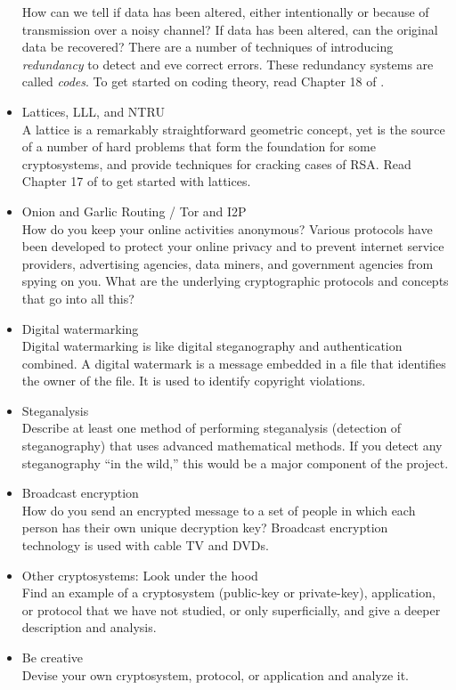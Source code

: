 \begin{itemize}
		How can we tell if data has been altered, either intentionally or because of transmission over a noisy channel? If data has been altered, can the original data be recovered? There are a number of techniques of introducing {\em redundancy} to detect and eve correct errors. These redundancy systems are called {\em codes}. To get started on coding theory, read Chapter 18 of \cite{tw}.
		\item{Lattices, LLL, and NTRU}\\
		A lattice is a remarkably straightforward geometric concept, yet is the source of a number of hard problems that form the foundation for some cryptosystems, and provide techniques for cracking cases of RSA. Read Chapter 17 of \cite{tw} to get started with lattices.
		\item{Onion and Garlic Routing / Tor and I2P}\\
		How do you keep your online activities anonymous? Various protocols have been developed to protect your online privacy and to prevent internet service providers, advertising agencies, data miners, and government agencies from spying on you. What are the underlying cryptographic protocols and concepts that go into all this?
		\item Digital watermarking\\
		Digital watermarking is like digital steganography and authentication combined. A digital watermark is a message embedded in a file that identifies the owner of the file. It is used to identify copyright violations.
                \item Steganalysis \\
                  Describe at least one method of performing steganalysis (detection of steganography) that uses advanced mathematical methods. If you detect any steganography ``in the wild,'' this would be a major component of the project.
		\item Broadcast encryption\\
		How do you send an encrypted message to a set of people in which each person has their own unique decryption key? Broadcast encryption technology is used with cable TV and DVDs.
		\item Other cryptosystems: Look under the hood\\
		Find an example of a cryptosystem (public-key or private-key), application, or protocol that we have not studied, or only superficially, and give a deeper description and analysis.
		\item Be creative\\
		Devise your own cryptosystem, protocol, or application and analyze it.
	\end{itemize}
